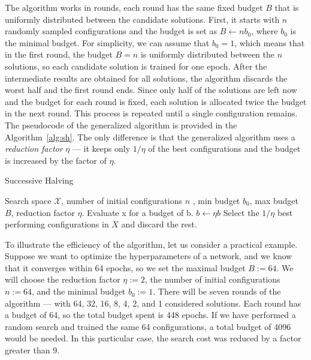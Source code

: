  The algorithm works in rounds, each round has the same fixed budget $B$ that is uniformly distributed between the candidate solutions. First, it starts with $n$ randomly sampled configurations and the budget is set as $B \leftarrow nb_0$, where $b_0$ is the minimal budget. For simplicity, we can assume that $b_0=1$, which means that in the first round, the budget $B=n$ is uniformly distributed between the $n$ solutions, so each candidate solution is trained for one epoch. After the intermediate results are obtained for all solutions, the algorithm discards the worst half and the first round ends. Since only half of the solutions are left now and the budget for each round is fixed, each solution is allocated twice the budget in the next round. This process is repeated until a single configuration remains. The pseudocode of the generalized algorithm is provided in the Algorithm~\ref{alg:sh}. The only difference is that the generalized algorithm uses a \textit{reduction factor} $\eta$ --- it keeps only $1/\eta$ of the best configurations and the budget is increased by the factor of $\eta$.

 \begin{algorithm}
    \caption{Successive Halving}
    \begin{algorithmic}[1]
     Search space $\mathcal{X}$,\hspace{1mm} number of initial configurations $n$ ,\hspace{1mm} min budget $b_0$,\hspace{1mm} max budget $B$,\hspace{1mm} reduction factor $\eta$.
            \State Evaluate x for a budget of b.
        \EndFor
        \State $b \leftarrow \eta b$
        \State Select the $1/\eta$ best performing configurations in $X$ and discard the rest.
    \EndWhile
    \end{algorithmic}
    \label{alg:sh}
\end{algorithm}

To illustrate the efficiency of the algorithm, let us consider a practical example. Suppose we want to optimize the hyperparameters of a network, and we know that it converges within 64 epochs, so we set the maximal budget $B:=64$. We will choose the reduction factor $\eta:=2$, the number of initial configurations $n:=64$, and the minimal budget $b_0:=1$. There will be seven rounds of the algorithm --- with 64, 32, 16, 8, 4, 2, and 1 considered solutions. Each round has a budget of 64, so the total budget spent is 448 epochs. If we have performed a random search and trained the same 64 configurations, a total budget of 4096 would be needed. In this particular case, the search cost was reduced by a factor greater than 9.

